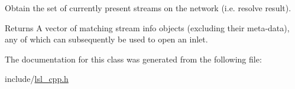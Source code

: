 Obtain the set of currently present streams on the network (i.\+e. resolve result). \begin{DoxyReturn}{Returns}
A vector of matching stream info objects (excluding their meta-\/data), any of which can subsequently be used to open an inlet. 
\end{DoxyReturn}


The documentation for this class was generated from the following file\+:\begin{DoxyCompactItemize}
\item 
include/\hyperlink{lsl__cpp_8h}{lsl\+\_\+cpp.\+h}\end{DoxyCompactItemize}
